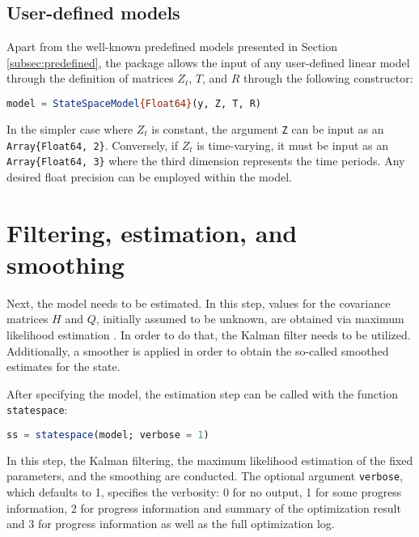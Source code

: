 \documentclass{juliacon}
\begin{document}
\subsection{User-defined models}

Apart from the well-known predefined models presented in Section \ref{subsec:predefined}, the package allows the input of any user-defined linear model through the definition of matrices $Z_{t}$, $T$, and $R$ through the following constructor:
%
\begin{lstlisting}[language = Julia]
model = StateSpaceModel{Float64}(y, Z, T, R)
\end{lstlisting}

In the simpler case where $Z_{t}$ is constant, the argument \texttt{Z} can be input as an \texttt{Array\{Float64, 2\}}. Conversely, if $Z_{t}$ is time-varying, it must be input as an \texttt{Array\{Float64, 3\}} where the third dimension represents the time periods. Any desired float precision can be employed within the model.

\section{Filtering, estimation, and smoothing} \label{sec:estimation}

Next, the model needs to be estimated. In this step, values for the covariance matrices $H$ and $Q$, initially assumed to be unknown, are obtained via maximum likelihood estimation \cite{casella2002statistical}. In order to do that, the Kalman filter needs to be utilized. Additionally, a smoother is applied in order to obtain the so-called smoothed estimates for the state.

After specifying the model, the estimation step can be called with the function \texttt{statespace}:
%
\begin{lstlisting}[language = Julia]
ss = statespace(model; verbose = 1)
\end{lstlisting}

In this step, the Kalman filtering, the maximum likelihood estimation of the fixed parameters, and the smoothing are conducted. The optional argument \texttt{verbose}, which defaults to 1, specifies the verbosity: 0 for no output, 1 for some progress information, 2 for progress information and summary of the optimization result and 3 for progress information as well as the full optimization log.
\end{document}
